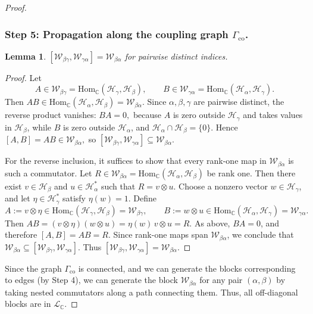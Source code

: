 \documentclass[10pt,twocolumn,superscriptaddress,aps,amsmath,amssymb,citeautoscript,floatfix,prx]{revtex4-2}
\theoremstyle{plain}
\theoremstyle{plain}
\theoremstyle{plain}
\theoremstyle{plain}
\theoremstyle{plain}
\theoremstyle{plain}
\newcommand{\C}{\mathbb{C}}
\newcommand{\Hom}{\mathrm{Hom}}
\newcommand{\HH}{\mathcal{H}}
\theoremstyle{plain}
\newtheorem{smlemma}[smtheorem]{Lemma}
\theoremstyle{definition}
\theoremstyle{plain}
\begin{document}
\begin{appendix}
\begin{proof}
\subsubsection*{Step 5: Propagation along the coupling graph $\Gamma_{\mathrm{co}}$.}

\begin{smlemma}
    $[\mathcal{W}_{\beta\gamma}, \mathcal{W}_{\gamma\alpha}] = \mathcal{W}_{\beta\alpha}$ for pairwise distinct indices.
\end{smlemma}
\begin{proof}
Let
\[
A\in \mathcal W_{\beta\gamma}=\Hom_\C(\HH_\gamma,\HH_\beta),
\qquad
B\in \mathcal W_{\gamma\alpha}=\Hom_\C(\HH_\alpha,\HH_\gamma).
\]
Then
$
AB\in \Hom_\C(\HH_\alpha,\HH_\beta)=\mathcal W_{\beta\alpha}.
$
Since \(\alpha,\beta,\gamma\) are pairwise distinct, the reverse product vanishes:
$
BA=0,
$
because \(A\) is zero outside \(\HH_\gamma\) and takes values in \(\HH_\beta\), while \(B\) is zero outside \(\HH_\alpha\), 
and \(\HH_\alpha\cap \HH_\beta=\{0\}\).
Hence
$
[A,B]=AB\in \mathcal W_{\beta\alpha},
$
so
$
[\mathcal W_{\beta\gamma},\mathcal W_{\gamma\alpha}]
\subseteq
\mathcal W_{\beta\alpha}.
$

For the reverse inclusion, it suffices to show that every rank-one map in
\(\mathcal W_{\beta\alpha}\) is such a commutator. Let
$
R\in \mathcal W_{\beta\alpha}=\Hom_\C(\HH_\alpha,\HH_\beta)
$
be rank one. Then there exist \(v\in \HH_\beta\) and \(u\in \HH_\alpha^*\) such that
$
R=v\otimes u.
$
Choose a nonzero vector \(w\in \HH_\gamma\), and let \(\eta\in \HH_\gamma^*\) satisfy
\(\eta(w)=1\). Define
\[
A:=v\otimes \eta \in \Hom_\C(\HH_\gamma,\HH_\beta)=\mathcal W_{\beta\gamma},
\qquad
B:=w\otimes u \in \Hom_\C(\HH_\alpha,\HH_\gamma)=\mathcal W_{\gamma\alpha}.
\]
Then
$
AB=(v\otimes \eta)(w\otimes u)=\eta(w)\,v\otimes u=R.
$
As above, \(BA=0\), and therefore
$
[A,B]=AB=R.
$
Since rank-one maps span \(\mathcal W_{\beta\alpha}\), we conclude that
$
\mathcal W_{\beta\alpha}\subseteq
[\mathcal W_{\beta\gamma},\mathcal W_{\gamma\alpha}].
$
Thus
$
[\mathcal W_{\beta\gamma},\mathcal W_{\gamma\alpha}]=\mathcal W_{\beta\alpha}.
$
\end{proof}

Since the graph $\Gamma_{\mathrm{co}}$ is connected, and we can generate the blocks corresponding to edges (by Step 4),
we can generate the block $\mathcal{W}_{\beta\alpha}$ for any pair $(\alpha, \beta)$ by taking nested commutators along a path connecting them. 
Thus, all off-diagonal blocks are in $\mathcal{L}_\C$.


\end{proof}
\end{appendix}
\end{document}
